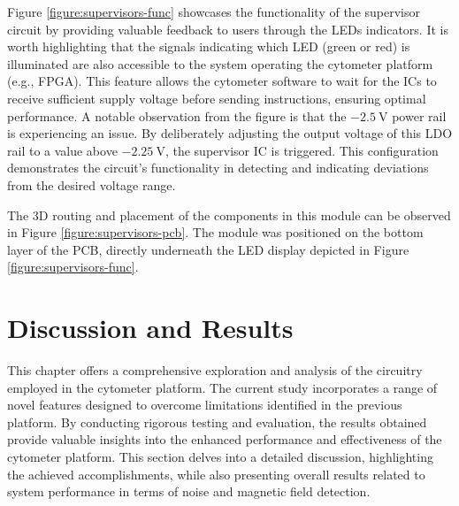 Figure \ref{figure:supervisors-func} showcases the functionality of the supervisor circuit by providing valuable feedback to users through the \ac{LED}s indicators. It is worth highlighting that the signals indicating which \ac{LED} (green or red) is illuminated are also accessible to the system operating the cytometer platform (e.g., \ac{FPGA}). This feature allows the cytometer software to wait for the \ac{IC}s to receive sufficient supply voltage before sending instructions, ensuring optimal performance. A notable observation from the figure is that the $\mathrm{-2.5~V}$ power rail is experiencing an issue. By deliberately adjusting the output voltage of this \ac{LDO} rail to a value above $\mathrm{-2.25~V}$, the supervisor \ac{IC} is triggered. This configuration demonstrates the circuit's functionality in detecting and indicating deviations from the desired voltage range.

The \ac{3D} routing and placement of the components in this module can be observed in Figure \ref{figure:supervisors-pcb}. The module was positioned on the bottom layer of the \ac{PCB}, directly underneath the \ac{LED} display depicted in Figure \ref{figure:supervisors-func}.


\section{Discussion and Results}
\label{chapter:fe-results}

This chapter offers a comprehensive exploration and analysis of the circuitry employed in the cytometer platform. The current study incorporates a range of novel features designed to overcome limitations identified in the previous platform. By conducting rigorous testing and evaluation, the results obtained provide valuable insights into the enhanced performance and effectiveness of the cytometer platform. This section delves into a detailed discussion, highlighting the achieved accomplishments, while also presenting overall results related to system performance in terms of noise and magnetic field detection.

